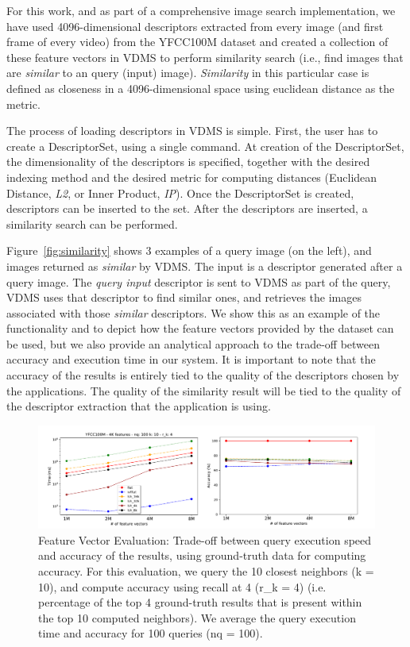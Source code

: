 For this work, and as part of a comprehensive image search implementation,
we have used 4096-dimensional descriptors extracted from every image
(and first frame of every video) from the YFCC100M dataset
and created a collection of these feature vectors in VDMS to
perform similarity search (i.e., find images that are
\textit{similar} to an query (input) image).
\textit{Similarity} in this particular case is defined as closeness
in a 4096-dimensional space using euclidean distance as the metric.

The process of loading descriptors in VDMS is simple.
First, the user has to create a DescriptorSet, using a single command.
At creation of the DescriptorSet, the dimensionality of the descriptors
is specified, together with the desired indexing method and the desired metric
for computing distances (Euclidean Distance, \textit{L2},
or Inner Product, \textit{IP}).
Once the DescriptorSet is created, descriptors can be inserted to the set.
After the descriptors are inserted, a similarity search can be performed.

Figure~\ref{fig:similarity} shows 3 examples of a query image (on the left),
and images returned as \textit{similar} by VDMS.
The input is a descriptor generated after a query image.
The \textit{query input} descriptor is sent to VDMS as part of the query,
VDMS uses that descriptor to find similar ones,
and retrieves the images associated with those \textit{similar} descriptors.
We show this as an example of the functionality and to depict
how the feature vectors provided by the dataset can be used,
but we also provide an analytical approach to
the trade-off between accuracy and execution time in our system.
It is important to note that the accuracy of the results is entirely tied
to the quality of the descriptors chosen by the applications.
The quality of the similarity result will be tied to the quality
of the descriptor extraction that the application is using.

\begin{figure}
\centering
\includegraphics[width=\textwidth]{figures/features_alternatives}
\caption{Feature Vector Evaluation: Trade-off between query execution speed
and accuracy of the results, using ground-truth data for computing accuracy.
For this evaluation, we query the 10 closest neighbors (k = 10), and compute
accuracy using recall at 4 (r\_k = 4) (i.e. percentage of the top 4 ground-truth
results that is present within the top 10 computed neighbors).
We average the query execution time and accuracy for 100 queries (nq = 100).}
\label{fig:features_eval}
\end{figure}

